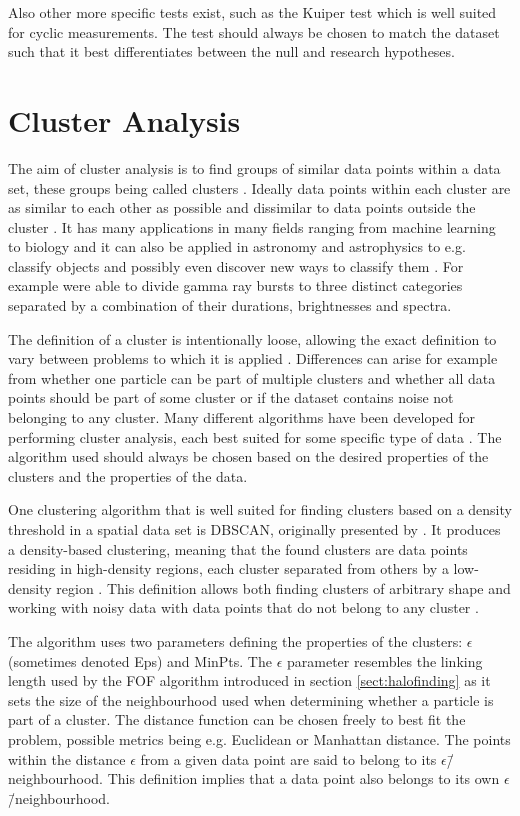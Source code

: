 \documentclass[english, oneside]{HYgradu}
\begin{document}
Also other more specific tests exist, such as the Kuiper test which is well suited for cyclic measurements. The test should always be chosen to match the dataset such that it best differentiates between the null and research hypotheses.

\section{Cluster Analysis}
The aim of cluster analysis is to find groups of similar data points within a data set, these groups being called clusters \citep{han2000data}. Ideally data points within each cluster are as similar to each other as possible and dissimilar to data points outside the cluster \citep{han2000data}. It has many applications in many fields ranging from machine learning to biology and it can also be applied in astronomy and astrophysics to e.g. classify objects and possibly even discover new ways to classify them \citep{ball2010data, han2000data}. For example \citet{mukherjee1998three} were able to divide gamma ray bursts to three distinct categories separated by a combination of their durations, brightnesses and spectra.

The definition of a cluster is intentionally loose, allowing the exact definition to vary between problems to which it is applied \citep{tan2006introduction}. Differences can arise for example from whether one particle can be part of multiple clusters and whether all data points should be part of some cluster or if the dataset contains noise not belonging to any cluster. Many different algorithms have been developed for performing cluster analysis, each best suited for some specific type of data \citep{han2000data}. The algorithm used should always be chosen based on the desired properties of the clusters and the properties of the data.

One clustering algorithm that is well suited for finding clusters based on a density threshold in a spatial data set is DBSCAN, originally presented by \citet{ester1996density}. It produces a density-based clustering, meaning that the found clusters are data points residing in high-density regions, each cluster separated from others by a low-density region \citep{han2000data}. This definition allows both finding clusters of arbitrary shape and working with noisy data with data points that do not belong to any cluster \citep{ester1996density}.

The algorithm uses two parameters defining the properties of the clusters: $\epsilon$ (sometimes denoted Eps) and MinPts. The $\epsilon$ parameter resembles the linking length used by the FOF algorithm introduced in section \ref{sect:halofinding} as it sets the size of the neighbourhood used when determining whether a particle is part of a cluster. The distance function can be chosen freely to best fit the problem, possible metrics being e.g. Euclidean or Manhattan distance. The points within the distance $\epsilon$ from a given data point are said to belong to its $\epsilon$\=/neighbourhood. This definition implies that a data point also belongs to its own $\epsilon$\=/neighbourhood.
\end{document}
